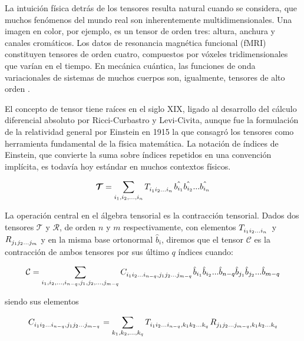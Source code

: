 \documentclass[11pt,a4paper]{report}
\newcommand{\refbox}[2]{%
  \begingroup
  \setlength{\fboxsep}{0.6pt}
  \fcolorbox{#1}{white}{\mbox{#2}}%
  \endgroup
}
\newcommand{\citebox}[1]{%
  \refbox{RefCiteGreen}{\cite{#1}}%
}
\begin{document}
La intuición física detrás de los tensores resulta natural cuando se considera, que muchos fenómenos del mundo real son inherentemente multidimensionales. Una imagen en color, por ejemplo, es un tensor de orden tres: altura, anchura y canales cromáticos. Los datos de resonancia magnética funcional (fMRI) constituyen tensores de orden cuatro, compuestos por vóxeles tridimensionales que varían en el tiempo. En mecánica cuántica, las funciones de onda variacionales de sistemas de muchos cuerpos son, igualmente, tensores de alto orden \citebox{wang2023tensor}.

El concepto de tensor tiene raíces en el siglo XIX, ligado al desarrollo del cálculo diferencial absoluto por Ricci-Curbastro y Levi-Civita, aunque fue la formulación de la relatividad general por Einstein en 1915 la que consagró los tensores como herramienta fundamental de la física matemática. La notación de índices de Einstein, que convierte la suma sobre índices repetidos en una convención implícita, es todavía hoy estándar en muchos contextos físicos.

\begin{equation} \label{eq: 1}
    \boldsymbol{\mathcal{T}} = \sum_{i_1, i_2,..., i_n} \tensor{T}{_{i_1}_{i_2}_{...}_{i_n}} \hat{b_{i_1}} \hat{b_{i_2}}...\hat{b_{i_n}}
\end{equation}

La operación central en el álgebra tensorial es la contracción tensorial. Dados dos tensores $\boldsymbol{\mathcal{T}}$ y $\boldsymbol{\mathcal{R}}$, de orden $n$ y $m$ respectivamente, con elementos $\tensor{T}{_{i_1}_{i_2}_{...}_{i_n}}$ y $\tensor{R}{_{j_1}_{j_2}_{...}_{j_m}}$ y en la misma base ortonormal $\hat{b}_{i}$, diremos que el tensor $\boldsymbol{\mathcal{C}}$ es la contracción de ambos tensores por sus último $q$ índices cuando:

\begin{equation} \label{eq: 2}
    \mathcal{C} = \sum_{i_1, i_2,...,i_{n-q},j_1,j_2,...,j_{m-q}} \tensor{C}{_{i_1}_{i_2}_{...}_{i_{n-q}}_{,}_{j_1}_{j_2}_{...}_{j_{m-q}}} \hat{b}_{i_1}\hat{b}_{i_2}...\hat{b}_{n-q}\hat{b}_{j_1}\hat{b}_{j_2}...\hat{b}_{m-q}
\end{equation}

siendo sus elementos

\begin{equation} \label{eq: 3}
    \tensor{C}{_{i_1}_{i_2}_{...}_{i_{n-q}}_{,}_{j_1}_{j_2}_{...}_{j_{m-q}}} = \sum_{k_1, k_2,...,k_{q}} \tensor{T}{_{i_1}_{i_2}_{...}_{i_{n-q}}_{,}_{k_1}_{k_2}_{...}_{k_{q}}} \tensor{R}{_{j_1}_{j_2}_{...}_{j_{m-q}}_{,}_{k_1}_{k_2}_{...}_{k_{q}}}
\end{equation}
\end{document}
